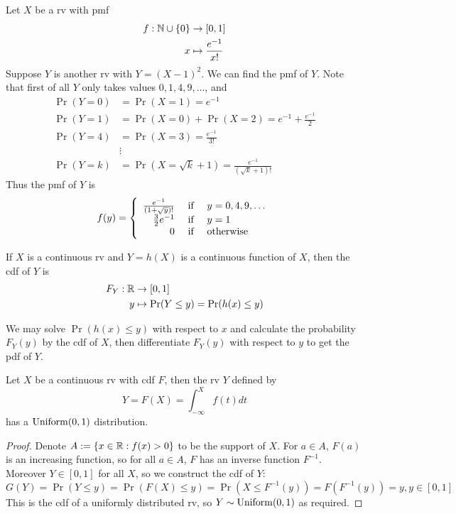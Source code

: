 \documentclass[11pt,fleqn]{book} %
\begin{document}
\begin{example}
Let \(X\) be a rv with pmf
\[
\begin{aligned}
f: \mathbb{N}\cup\{0\} &\rightarrow [0, 1] \\
x &\mapsto \frac{e^{-1}}{x!}
\end{aligned}
\]
\indent Suppose \(Y\) is another rv with \(Y = (X - 1)^2\). We can find the pmf of \(Y\). Note that first of all \(Y\) only takes values \(0, 1, 4, 9, \ldots\), and
\[
\begin{aligned}
\Pr(Y = 0) &= \Pr(X = 1) = e^{-1} \\
\Pr(Y = 1) &= \Pr(X = 0) + \Pr(X = 2) = e^{-1} + \frac{e^{-1}}{2} \\
\Pr(Y = 4) &= \Pr(X = 3) = \frac{e^{-1}}{3!} \\
&\vdots \\
\Pr(Y = k) &= \Pr(X = \sqrt{k} + 1) = \frac{e^{-1}}{(\sqrt{k} + 1)!}
\end{aligned}
\]
\indent Thus the pmf of \(Y\) is
\[
f(y) = \left\{
\begin{array}{rcl}
\frac{e^{-1}}{(1 + \sqrt{y})!} & \text{ if } & y = 0, 4, 9, \ldots \\
\frac{3}{2}e^{-1} & \text{ if } & y = 1 \\
0 & \text{ if } & \mbox{otherwise}
\end{array}
\right.
\]
\end{example}

\begin{definition} 
If \(X\) is a continuous rv and \(Y = h(X)\) is a continuous function of \(X\), then the cdf of \(Y\) is
\[
\begin{aligned}
F_Y: \mathbb{R} &\rightarrow [0, 1] \\
y &\mapsto \Pr(Y \leq y) = \Pr(h(x) \leq y)
\end{aligned}
\]
\end{definition}

\begin{remark} 
We may solve \(\Pr(h(x) \leq y)\) with respect to \(x\) and calculate the probability \(F_Y(y)\) by the cdf of \(X\), then differentiate \(F_Y(y)\) with respect to \(y\) to get the pdf of \(Y\).
\end{remark}

\begin{theorem}
Let \(X\) be a continuous rv with cdf \(F\), then the rv \(Y\) defined by
\[
Y = F(X) = \int_{-\infty}^X f(t)dt
\]
has a \(\operatorname{Uniform}(0, 1)\) distribution.
\end{theorem}
\begin{proof}
Denote \(A := \{x \in \mathbb{R}: f(x) > 0\}\) to be the support of \(X\). For \(a \in A\), \(F(a)\) is an increasing function, so for all \(a \in A\), \(F\) has an inverse function \(F^{-1}\). Moreover \(Y \in [0, 1]\) for all \(X\), so we construct the cdf of \(Y\):
\[
G(Y) = \Pr(Y \leq y) = \Pr(F(X) \leq y) = \Pr(X \leq F^{-1}(y)) = F(F^{-1}(y)) = y, y \in [0, 1]
\]
\indent This is the cdf of a uniformly distributed rv, so \(Y \sim \operatorname{Uniform}(0, 1)\) as required.
\end{proof}
\end{document}

